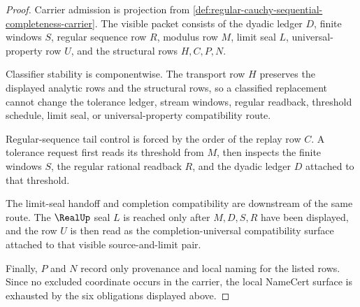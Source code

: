 \begin{proof}
Carrier admission is projection from \autoref{def:regular-cauchy-sequential-completeness-carrier}. The visible packet consists of the dyadic ledger $D$, finite windows $S$, regular sequence row $R$, modulus row $M$, limit seal $L$, universal-property row $U$, and the structural rows $H,C,P,N$.

Classifier stability is componentwise. The transport row $H$ preserves the displayed analytic rows and the structural rows, so a classified replacement cannot change the tolerance ledger, stream windows, regular readback, threshold schedule, limit seal, or universal-property compatibility route.

Regular-sequence tail control is forced by the order of the replay row $C$. A tolerance request first reads its threshold from $M$, then inspects the finite windows $S$, the regular rational readback $R$, and the dyadic ledger $D$ attached to that threshold.

The limit-seal handoff and completion compatibility are downstream of the same route. The $\RealUp$ seal $L$ is reached only after $M,D,S,R$ have been displayed, and the row $U$ is then read as the completion-universal compatibility surface attached to that visible source-and-limit pair.

Finally, $P$ and $N$ record only provenance and local naming for the listed rows. Since no excluded coordinate occurs in the carrier, the local NameCert surface is exhausted by the six obligations displayed above.
\end{proof}


